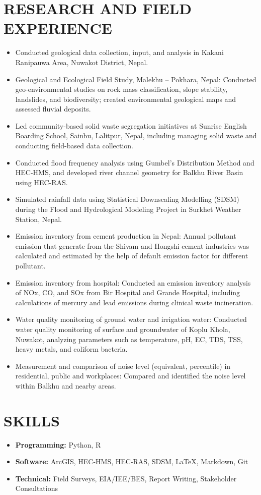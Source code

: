 \documentclass[a4paper, 11pt]{extarticle}
\begin{document}
\section*{RESEARCH AND FIELD EXPERIENCE}
\begin{itemize}
    \item Conducted geological data collection, input, and analysis in Kakani Ranipauwa Area, Nuwakot District, Nepal.
    \item Geological and Ecological Field Study, Malekhu – Pokhara, Nepal: Conducted geo-environmental studies on rock mass classification, slope stability, landslides, and biodiversity; created environmental geological maps and assessed fluvial deposits.
    \item Led community-based solid waste segregation initiatives at Sunrise English Boarding School, Sainbu, Lalitpur, Nepal, including managing solid waste and conducting field-based data collection.
    \item Conducted flood frequency analysis using Gumbel’s Distribution Method and HEC-HMS, and developed river channel geometry for Balkhu River Basin using HEC-RAS.
    \item Simulated rainfall data using Statistical Downscaling Modelling (SDSM) during the Flood and Hydrological Modeling Project in Surkhet Weather Station, Nepal.
    \item Emission inventory from cement production in Nepal:  Annual pollutant emission that generate from the Shivam and Hongshi cement industries was calculated and estimated by the help of default emission factor for different pollutant.
    \item Emission inventory from hospital: Conducted an emission inventory analysis of NOx, CO, and SOx from Bir Hospital and Grande Hospital, including calculations of mercury and lead emissions during clinical waste incineration.
    \item Water quality monitoring of ground water and irrigation water: Conducted water quality monitoring of surface and groundwater of Koplu Khola, Nuwakot, analyzing parameters such as temperature, pH, EC, TDS, TSS, heavy metals, and coliform bacteria.
    \item Measurement and comparison of noise level (equivalent, percentile) in residential, public and workplaces: Compared and identified the noise level within Balkhu and nearby areas.
\end{itemize}

\vspace{5pt}
\section*{SKILLS}
\begin{itemize}
    \item \textbf{Programming:} Python, R
    \item \textbf{Software:} ArcGIS, HEC-HMS, HEC-RAS, SDSM, LaTeX, Markdown, Git
    \item \textbf{Technical:} Field Surveys, EIA/IEE/BES, Report Writing, Stakeholder Consultations
\end{itemize}
\end{document}
